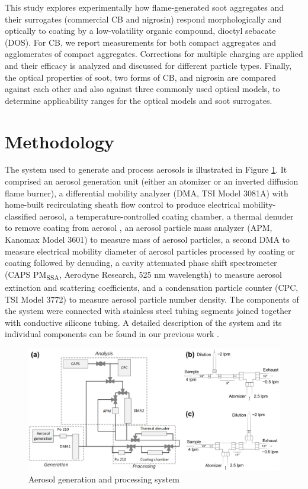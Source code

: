 \documentclass[12pt,authoryear]{elsarticle}
\begin{document}
This study explores experimentally how flame-generated soot aggregates and their surrogates (commercial CB and nigrosin) respond morphologically and optically to coating by a low-volatility organic compound, dioctyl sebacate (DOS). For CB, we report measurements for both compact aggregates and agglomerates of compact aggregates. Corrections for multiple charging are applied and their efficacy is analyzed and discussed for different particle types. Finally, the optical properties of soot, two forms of CB, and nigrosin are compared against each other and also against three commonly used optical models, to determine applicability ranges for the optical models and soot surrogates.

\section{Methodology}


The system used to generate and process aerosols is illustrated in Figure \ref{fig:system}. It comprised an aerosol generation unit (either an atomizer or an inverted diffusion flame burner), a differential mobility analyzer (DMA, TSI Model 3081A) with home-built recirculating sheath flow control to produce electrical mobility-classified aerosol, a temperature-controlled coating chamber, a thermal denuder to remove coating from aerosol \citep{RN39}, an aerosol particle mass analyzer (APM, Kanomax Model 3601) to measure mass of aerosol particles, a second DMA to measure electrical mobility diameter of aerosol particles processed by coating or coating followed by denuding, a cavity attenuated phase shift spectrometer (CAPS PM\textsubscript{SSA}, Aerodyne Research, 525 nm wavelength) to measure aerosol extinction and scattering coefficients, and a condensation particle counter (CPC, TSI Model 3772) to measure aerosol particle number density. The components of the system were connected with stainless steel tubing segments joined together with conductive silicone tubing. A detailed description of the system and its individual components can be found in our previous work \citep{RN48,RN49}.

\begin{figure}[ht]
\centering
\includegraphics[scale=0.7]{system_diagram.png}
\caption{Aerosol generation and processing system}
\label{fig:system}
\end{figure}
\end{document}
